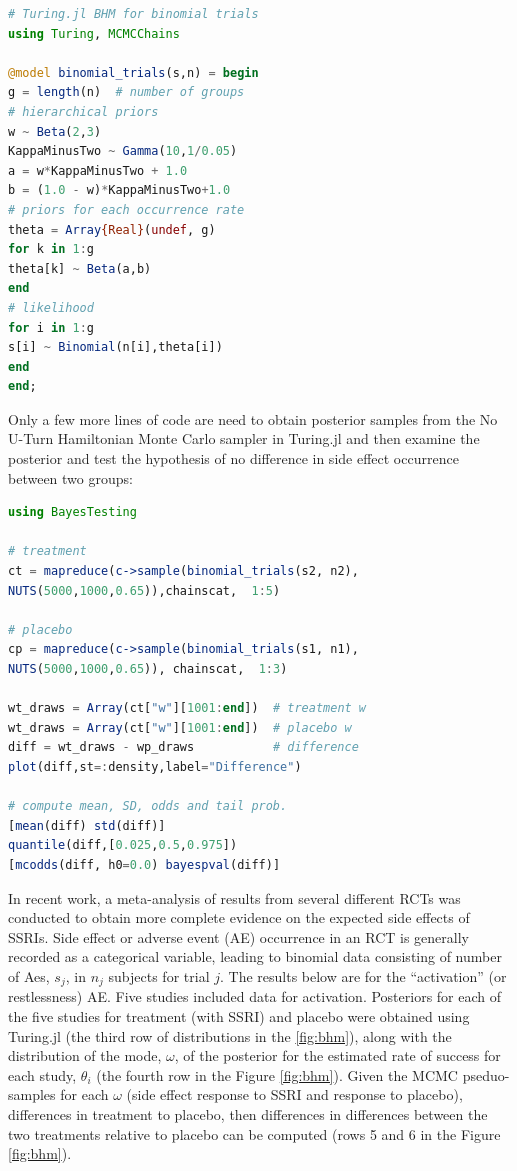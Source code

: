 \documentclass{juliacon}
\begin{document}
\begin{lstlisting}[language = Julia]
# Turing.jl BHM for binomial trials
using Turing, MCMCChains

@model binomial_trials(s,n) = begin
g = length(n)  # number of groups
# hierarchical priors
w ~ Beta(2,3)
KappaMinusTwo ~ Gamma(10,1/0.05) 
a = w*KappaMinusTwo + 1.0
b = (1.0 - w)*KappaMinusTwo+1.0
# priors for each occurrence rate
theta = Array{Real}(undef, g)
for k in 1:g
theta[k] ~ Beta(a,b)
end
# likelihood
for i in 1:g
s[i] ~ Binomial(n[i],theta[i])
end
end;
\end{lstlisting}

Only a few more lines of code are need to obtain posterior samples from the No U-Turn Hamiltonian Monte Carlo sampler in Turing.jl and then examine the posterior and test the hypothesis of no difference in side effect occurrence between two groups:
\begin{lstlisting}[language = Julia]
using BayesTesting

# treatment
ct = mapreduce(c->sample(binomial_trials(s2, n2),  
NUTS(5000,1000,0.65)),chainscat,  1:5)

# placebo
cp = mapreduce(c->sample(binomial_trials(s1, n1), 
NUTS(5000,1000,0.65)), chainscat,  1:3)

wt_draws = Array(ct["w"][1001:end])  # treatment w
wt_draws = Array(ct["w"][1001:end])  # placebo w
diff = wt_draws - wp_draws           # difference
plot(diff,st=:density,label="Difference")

# compute mean, SD, odds and tail prob.
[mean(diff) std(diff)]
quantile(diff,[0.025,0.5,0.975])
[mcodds(diff, h0=0.0) bayespval(diff)]
\end{lstlisting}

In recent work,\cite{Mills2019b} a meta-analysis of results from several different RCTs was conducted to obtain more complete evidence on the expected side effects of SSRIs.  Side effect or adverse event (AE) occurrence in an RCT is generally recorded as a categorical variable, leading to binomial data consisting of number of Aes, $s_j$, in $n_j$ subjects for trial $j$. The results below are for the  “activation” (or restlessness) AE.  Five studies included data for activation.  Posteriors for each of the five studies for treatment (with SSRI) and placebo were obtained using Turing.jl (the third row of distributions in the \ref{fig:bhm}), along with the distribution of the mode, $\omega$, of the posterior for the estimated rate of success for each study, $\theta_i$ (the fourth row in the Figure \ref{fig:bhm}).  Given the MCMC pseduo-samples for each $\omega$ (side effect response to SSRI and response to placebo), differences in treatment to placebo, then differences in differences between the two treatments relative to placebo can be computed (rows 5 and 6 in the Figure \ref{fig:bhm}).
\vskip 6pt
\end{document}
